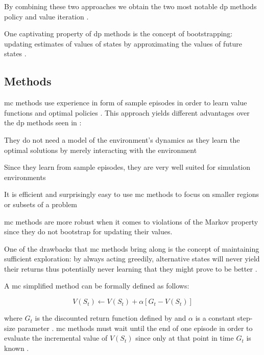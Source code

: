 By combining these two approaches we obtain the two most notable \gls{dp} methods \ie policy and value iteration \citep[p. 95]{Sutton2017}.

One captivating property of \gls{dp} methods is the concept of bootstrapping: updating estimates of values of states by approximating the values of future states \citep[p. 96]{Sutton2017}.

\subsection{ Methods}
\label{subsec:mc}

\gls{mc} methods use experience in form of sample episodes in order to learn value functions and optimal policies \citep[p. 123]{Sutton2017}. This approach yields different advantages over the \gls{dp} methods seen in  \citep[p. 123]{Sutton2017}:
\begin{enumerate*}
	\item They do not need a model of the environment's dynamics as they learn the optimal solutions by merely interacting with the environment
	\item Since they learn from sample episodes, they are very well suited for simulation environments
	\item It is efficient and surprisingly easy to use \gls{mc} methods to focus on smaller regions or subsets of a problem
	\item \gls{mc} methods are more robust when it comes to violations of the Markov property since they do not bootstrap for updating their values.
\end{enumerate*}

One of the drawbacks that \gls{mc} methods bring along is the concept of maintaining sufficient exploration: by always acting greedily, alternative states will never yield their returns thus potentially never learning that they might prove to be better \citep[p. 123]{Sutton2017}.

A \gls{mc} simplified method can be formally defined as follows:

\begin{equation}
\label{eq:mc_update}
	V(S_t) \leftarrow V(S_t) + \alpha [G_t - V(S_t)]
\end{equation}

where $G_t$ is the discounted return function defined by  and $\alpha$ is a constant step-size parameter \citep[p. 127]{Sutton2017}. \gls{mc} methods must wait until the end of one episode in order to evaluate the incremental value of $V(S_t)$ since only at that point in time $G_t$ is known \citep[p. 128]{Sutton2017}.


